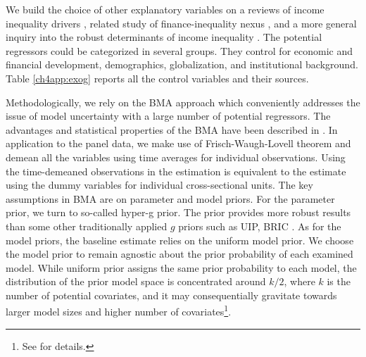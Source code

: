 \begin{refsection}
We build the choice of other explanatory variables on a reviews of income inequality drivers \parencite{roineetal2009,nolan2019drivers}, related study of finance-inequality nexus \parencite{de2017finance}, and a more general inquiry into the robust determinants of income inequality \parencite{furceri2019robust}. The potential regressors could be categorized in several groups. They control for economic and financial development, demographics, globalization, and institutional background. Table \ref{ch4app:exog} reports all the control variables and their sources. 

%
%
Methodologically, we rely on the \ac{BMA} approach which conveniently addresses the issue of model uncertainty with a large number of potential regressors. The advantages and statistical properties of the \ac{BMA} have been described in \textcite{Koop2003}. In application to the panel data, we make use of Frisch-Waugh-Lovell theorem and demean all the variables using time averages for individual observations. Using the time-demeaned observations in the estimation is equivalent to the estimate using the dummy variables for individual cross-sectional units. The key assumptions in \ac{BMA} are on parameter and model priors. For the parameter prior, we turn to so-called hyper-g prior. The prior provides more robust results than some other traditionally applied $g$ priors such as \ac{UIP}, \ac{BRIC} \parencite{feldkircher2012impact}. As for the model priors, the baseline estimate relies on the uniform model prior. We choose the model prior to remain agnostic about the prior probability of each examined model. While uniform prior assigns the same prior probability to each model, the distribution of the prior model space is concentrated around $k/2$, where $k$ is the number of potential covariates, and it may consequentially gravitate towards larger model sizes and higher number of covariates\footnote{See \textcite{LeySteel2009} for details.}.


\end{refsection}
